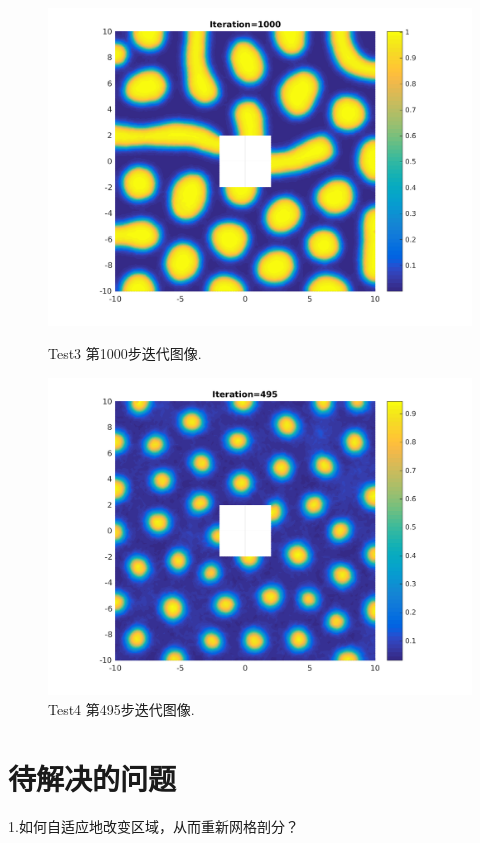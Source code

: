 \documentclass[12pt,a4paper]{article}
\begin{document}
\begin{figure}[h]
    \begin{minipage}[t]{0.4\linewidth}
    	\centering
    	\includegraphics[width=1.2\textwidth]{./figures/03.png}
    	\caption{Test3 第1000步迭代图像.}%
    	\label{fig:liuchengtu2}
    \end{minipage}
    \hfill
    \begin{minipage}[t]{0.4\linewidth}
    	\centering
    	\includegraphics[width=1.2\textwidth]{./figures/04.png}
    	\caption{Test4 第495步迭代图像.}%
    	\label{fig:liuchengtu2}
    \end{minipage}
\end{figure}

\newpage
\section{待解决的问题}
1.如何自适应地改变区域，从而重新网格剖分？
\end{document}
